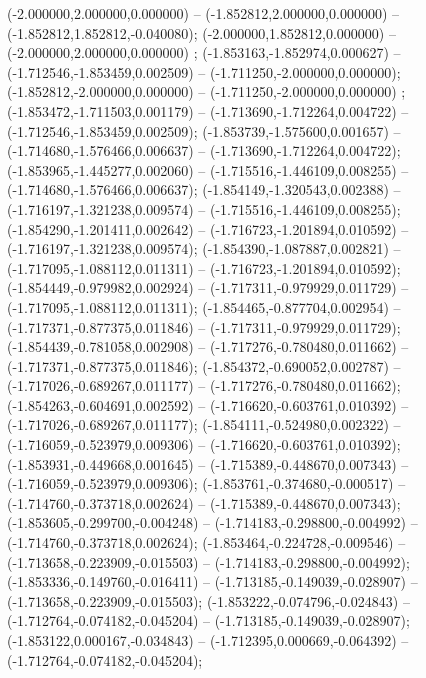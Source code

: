  (-2.000000,2.000000,0.000000) -- (-1.852812,2.000000,0.000000) -- (-1.852812,1.852812,-0.040080);
 (-2.000000,1.852812,0.000000) -- (-2.000000,2.000000,0.000000) ;
 (-1.853163,-1.852974,0.000627) -- (-1.712546,-1.853459,0.002509) -- (-1.711250,-2.000000,0.000000);
 (-1.852812,-2.000000,0.000000) -- (-1.711250,-2.000000,0.000000) ;
 (-1.853472,-1.711503,0.001179) -- (-1.713690,-1.712264,0.004722) -- (-1.712546,-1.853459,0.002509);
 (-1.853739,-1.575600,0.001657) -- (-1.714680,-1.576466,0.006637) -- (-1.713690,-1.712264,0.004722);
 (-1.853965,-1.445277,0.002060) -- (-1.715516,-1.446109,0.008255) -- (-1.714680,-1.576466,0.006637);
 (-1.854149,-1.320543,0.002388) -- (-1.716197,-1.321238,0.009574) -- (-1.715516,-1.446109,0.008255);
 (-1.854290,-1.201411,0.002642) -- (-1.716723,-1.201894,0.010592) -- (-1.716197,-1.321238,0.009574);
 (-1.854390,-1.087887,0.002821) -- (-1.717095,-1.088112,0.011311) -- (-1.716723,-1.201894,0.010592);
 (-1.854449,-0.979982,0.002924) -- (-1.717311,-0.979929,0.011729) -- (-1.717095,-1.088112,0.011311);
 (-1.854465,-0.877704,0.002954) -- (-1.717371,-0.877375,0.011846) -- (-1.717311,-0.979929,0.011729);
 (-1.854439,-0.781058,0.002908) -- (-1.717276,-0.780480,0.011662) -- (-1.717371,-0.877375,0.011846);
 (-1.854372,-0.690052,0.002787) -- (-1.717026,-0.689267,0.011177) -- (-1.717276,-0.780480,0.011662);
 (-1.854263,-0.604691,0.002592) -- (-1.716620,-0.603761,0.010392) -- (-1.717026,-0.689267,0.011177);
 (-1.854111,-0.524980,0.002322) -- (-1.716059,-0.523979,0.009306) -- (-1.716620,-0.603761,0.010392);
 (-1.853931,-0.449668,0.001645) -- (-1.715389,-0.448670,0.007343) -- (-1.716059,-0.523979,0.009306);
 (-1.853761,-0.374680,-0.000517) -- (-1.714760,-0.373718,0.002624) -- (-1.715389,-0.448670,0.007343);
 (-1.853605,-0.299700,-0.004248) -- (-1.714183,-0.298800,-0.004992) -- (-1.714760,-0.373718,0.002624);
 (-1.853464,-0.224728,-0.009546) -- (-1.713658,-0.223909,-0.015503) -- (-1.714183,-0.298800,-0.004992);
 (-1.853336,-0.149760,-0.016411) -- (-1.713185,-0.149039,-0.028907) -- (-1.713658,-0.223909,-0.015503);
 (-1.853222,-0.074796,-0.024843) -- (-1.712764,-0.074182,-0.045204) -- (-1.713185,-0.149039,-0.028907);
 (-1.853122,0.000167,-0.034843) -- (-1.712395,0.000669,-0.064392) -- (-1.712764,-0.074182,-0.045204);
